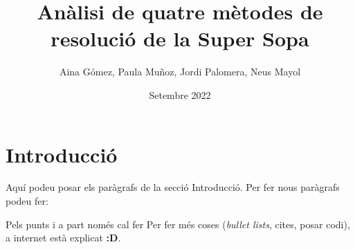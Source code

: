 \documentclass{article}
\title{Anàlisi de quatre mètodes de resolució de la Super Sopa}
\author{Aina Gómez, Paula Muñoz, Jordi Palomera, Neus Mayol}
\date{Setembre 2022}
\begin{document}
\maketitle

\section{Introducció}
Aquí podeu posar els paràgrafs de la secció Introducció. Per fer nous paràgrafs podeu fer:
\newline \par
Pels punts i a part només cal fer \newline
Per fer més coses (\emph{bullet lists}, cites, posar codi), a internet està explicat \textbf{:D}.
\end{document}
